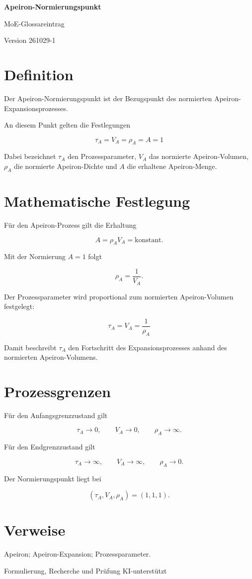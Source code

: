 \documentclass[a4paper,11pt]{article}
\begin{document}
\begin{center}
{\Large\bfseries Apeiron-Normierungspunkt}

\vspace{0.4em}
MoE-Glossareintrag

Version 261029-1
\end{center}

\section*{Definition}

Der Apeiron-Normierungspunkt ist der Bezugspunkt
des normierten Apeiron-Expansionsprozesses.

An diesem Punkt gelten die Festlegungen

\[
\boxed{
\tau_A = V_A = \rho_A = A = 1
}
\]

Dabei bezeichnet $\tau_A$ den Prozessparameter,
$V_A$ das normierte Apeiron-Volumen,
$\rho_A$ die normierte Apeiron-Dichte
und $A$ die erhaltene Apeiron-Menge.

\section*{Mathematische Festlegung}

Für den Apeiron-Prozess gilt die Erhaltung

\[
A = \rho_A V_A = \mathrm{konstant}.
\]

Mit der Normierung $A=1$ folgt

\[
\rho_A = \frac{1}{V_A}.
\]

Der Prozessparameter wird proportional
zum normierten Apeiron-Volumen festgelegt:

\[
\boxed{
\tau_A = V_A = \frac{1}{\rho_A}
}
\]

Damit beschreibt $\tau_A$ den Fortschritt
des Expansionsprozesses anhand des
normierten Apeiron-Volumens.

\section*{Prozessgrenzen}

Für den Anfangsgrenzzustand gilt

\[
\tau_A \to 0,\qquad
V_A \to 0,\qquad
\rho_A \to \infty.
\]

Für den Endgrenzzustand gilt

\[
\tau_A \to \infty,\qquad
V_A \to \infty,\qquad
\rho_A \to 0.
\]

Der Normierungspunkt liegt bei

\[
(\tau_A,V_A,\rho_A)=(1,1,1).
\]

\section*{Verweise}

Apeiron; Apeiron-Expansion; Prozessparameter.

\vfill
\begin{center}
\small
Formulierung, Recherche und Prüfung KI-unterstützt
\end{center}
\end{document}
